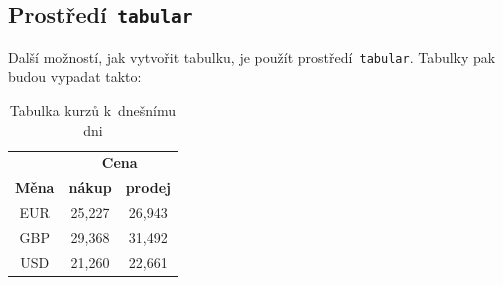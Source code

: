 \documentclass[a4paper, 11pt]{article}
\begin{document}
	\subsection{Prostředí\texttt{ tabular}}
	
	Další možností, jak vytvořit tabulku, je použít prostředí\texttt{ tabular}. Tabulky pak budou vypadat takto\footnotemark:
	\bigskip
	\begin{table}[h]
		\centering
		\begin{tabular}{|c|c|c|}
			\hline
			&\multicolumn{2}{c|}{\textbf{Cena}}\\ \cline{2-3}
			\textbf{Měna} &\textbf{nákup} &\textbf{prodej}\\ \hline
			EUR	&25,227	&26,943\\
			GBP	&29,368 &31,492\\
			USD	&21,260 &22,661\\ \hline
		\end{tabular}
		\caption{Tabulka kurzů k~dnešnímu dni}
		\label{table:kurzy}
	\end{table}
	\bigskip
	
\end{document}
